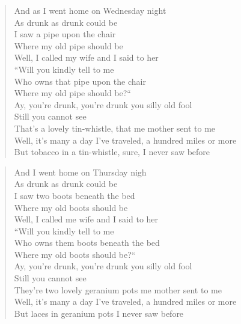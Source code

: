 \documentclass[8pt,twoside]{extarticle}
\newenvironment{xverse}{
	\interlinepenalty 10000
	\begin{verse}
	\begin{minipage}{\linewidth}
	\parskip 5pt
	\vspace{-6pt}
	}
	{
	\end{minipage}
	\end{verse}
	\penalty 0
	\vspace{-6pt}
	}
\begin{document}
\begin{xverse}
And as I went home on Wednesday night \\
As drunk as drunk could be \\
I saw a pipe upon the chair \\
Where my old pipe should be \\
Well, I called my wife and I said to her \\
“Will you kindly tell to me \\
Who owns that pipe upon the chair \\
Where my old pipe should be?“ \\
Ay, you’re drunk, you’re drunk you silly old fool \\
Still you cannot see \\
That’s a lovely tin-whistle, that me mother sent to me \\
Well, it’s many a day I’ve traveled, a hundred miles or more \\
But tobacco in a tin-whistle, sure, I never saw before \\
\end{xverse}

\begin{xverse}
And I went home on Thursday nigh \\
As drunk as drunk could be \\
I saw two boots beneath the bed \\
Where my old boots should be \\
Well, I called me wife and I said to her \\
“Will you kindly tell to me \\
Who owns them boots beneath the bed \\
Where my old boots should be?“ \\
Ay, you’re drunk, you’re drunk you silly old fool \\
Still you cannot see \\
They’re two lovely geranium pots me mother sent to me \\
Well, it’s many a day I’ve traveled, a hundred miles or more \\
But laces in geranium pots I never saw before \\
\end{xverse}
\end{document}
